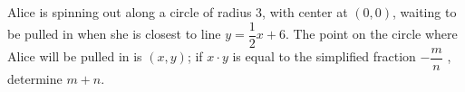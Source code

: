 Alice is spinning out along a circle of radius $3$, with center at $(0, 0)$, waiting to be pulled in when she is closest to line $y = \dfrac{1}{2} x + 6$. The point on the circle where Alice will be pulled in is $(x, y)$; if $x\cdot y$ is equal to the simplified fraction $-\dfrac{m}{n}$ , determine $m + n$.
